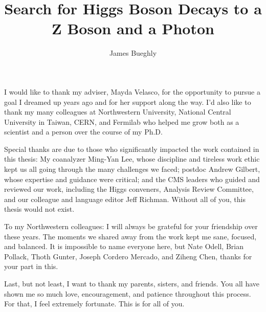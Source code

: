 \documentclass[12pt]{template/nuthesis}
\author{James Bueghly}
\title{Search for Higgs Boson Decays to a Z Boson and a Photon}
\begin{document}
%	
%


\frontmatter		%

\maketitle		%

\copyrightpage		%




\acknowledgements	%

I would like to thank my adviser, Mayda Velasco, for the opportunity to pursue a goal I dreamed up years ago and for her support along the way. I'd also like to thank my many colleagues at Northwestern University, National Central University in Taiwan, CERN, and Fermilab who helped me grow both as a scientist and a person over the course of my Ph.D. 

Special thanks are due to those who significantly impacted the work contained in this thesis: My coanalyzer Ming-Yan Lee, whose discipline and tireless work ethic kept us all going through the many challenges we faced; postdoc Andrew Gilbert, whose expertise and guidance were critical; and the CMS leaders who guided and reviewed our work, including the Higgs conveners, Analysis Review Committee, and our colleague and language editor Jeff Richman. Without all of you, this thesis would not exist.

To my Northwestern colleagues: I will always be grateful for your friendship over these years. The moments we shared away from the work kept me sane, focused, and balanced. It is impossible to name everyone here, but Nate Odell, Brian Pollack, Thoth Gunter, Joseph Cordero Mercado, and Ziheng Chen, thanks for your part in this.  

Last, but not least, I want to thank my parents, sisters, and friends. You all have shown me so much love, encouragement, and patience throughout this process. For that, I feel extremely fortunate. This is for all of you. 



%


%
%
%
%
%
%
%
%
\end{document}
